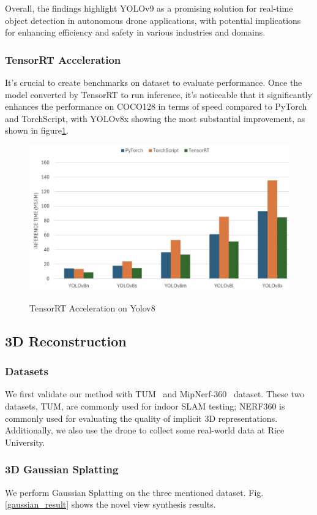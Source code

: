 \documentclass[conference]{IEEEtran}
\begin{document}
Overall, the findings highlight YOLOv9 as a promising solution for real-time object detection in autonomous drone applications, with potential implications for enhancing efficiency and safety in various industries and domains. 
\subsubsection{TensorRT Acceleration}

It's crucial to create benchmarks on dataset to evaluate performance. Once the model converted by TensorRT to run inference, it's noticeable that it significantly enhances the performance on COCO128 in terms of speed compared to PyTorch and TorchScript, with YOLOv8x showing the most substantial improvement, as shown in figure\ref{TensorRT}.
\begin{figure}[htbp]
    \centering
    \resizebox{9cm}{4cm}
    {\includegraphics{figures/tensor.png}}
    \caption{TensorRT Acceleration on Yolov8}
    \label{TensorRT}
\end{figure}
\subsection{3D Reconstruction}
\subsubsection{Datasets}
We first validate our method with TUM~\cite{tum} and MipNerf-360~\cite{mipnerf360} dataset. These two datasets, TUM, are commonly used for indoor SLAM testing; NERF360 is commonly used for evaluating the quality of implicit 3D representations. Additionally, we also use the drone to collect some real-world data at Rice University.
\subsubsection{3D Gaussian Splatting}
We perform Gaussian Splatting on the three mentioned dataset. Fig. \ref{gaussian_result} shows the novel view synthesis results.
\end{document}
